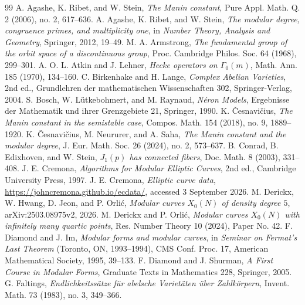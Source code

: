 \documentclass[12pt, letterpaper]{amsart}
\theoremstyle{definition}
\theoremstyle{remark}
\numberwithin{equation}{section}
\begin{document}
\begin{thebibliography}{99}
 A. Agashe, K. Ribet, and W. Stein, \emph{The Manin constant}, Pure Appl. Math. Q. 2 (2006), no. 2, 617--636.
 A. Agashe, K. Ribet, and W. Stein, \emph{The modular degree, congruence primes, and multiplicity one}, in \emph{Number Theory, Analysis and Geometry}, Springer, 2012, 19--49.
 M. A. Armstrong, \emph{The fundamental group of the orbit space of a discontinuous group}, Proc. Cambridge Philos. Soc. 64 (1968), 299--301.
 A. O. L. Atkin and J. Lehner, \emph{Hecke operators on $\Gamma_0(m)$}, Math. Ann. 185 (1970), 134--160.
 C. Birkenhake and H. Lange, \emph{Complex Abelian Varieties}, 2nd ed., Grundlehren der mathematischen Wissenschaften 302, Springer-Verlag, 2004.
 S. Bosch, W. L\"utkebohmert, and M. Raynaud, \emph{N\'eron Models}, Ergebnisse der Mathematik und ihrer Grenzgebiete 21, Springer, 1990.
 K. \v{C}esnavi\v{c}ius, \emph{The Manin constant in the semistable case}, Compos. Math. 154 (2018), no. 9, 1889--1920.
 K. \v{C}esnavi\v{c}ius, M. Neururer, and A. Saha, \emph{The Manin constant and the modular degree}, J. Eur. Math. Soc. 26 (2024), no. 2, 573--637.
 B. Conrad, B. Edixhoven, and W. Stein, \emph{$J_1(p)$ has connected fibers}, Doc. Math. 8 (2003), 331--408.
 J. E. Cremona, \emph{Algorithms for Modular Elliptic Curves}, 2nd ed., Cambridge University Press, 1997.
 J. E. Cremona, \emph{Elliptic curve data}, \url{https://johncremona.github.io/ecdata/}, accessed 3 September 2026.
 M. Derickx, W. Hwang, D. Jeon, and P. Orli\'c, \emph{Modular curves $X_0(N)$ of density degree $5$}, arXiv:2503.08975v2, 2026.
 M. Derickx and P. Orli\'c, \emph{Modular curves $X_0(N)$ with infinitely many quartic points}, Res. Number Theory 10 (2024), Paper No. 42.
 F. Diamond and J. Im, \emph{Modular forms and modular curves}, in \emph{Seminar on Fermat's Last Theorem} (Toronto, ON, 1993--1994), CMS Conf. Proc. 17, American Mathematical Society, 1995, 39--133.
 F. Diamond and J. Shurman, \emph{A First Course in Modular Forms}, Graduate Texts in Mathematics 228, Springer, 2005.
 G. Faltings, \emph{Endlichkeitss\"atze f\"ur abelsche Variet\"aten \"uber Zahlk\"orpern}, Invent. Math. 73 (1983), no. 3, 349--366.

\end{thebibliography}
\end{document}
